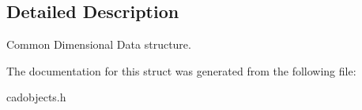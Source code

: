 \subsection{Detailed Description}
Common Dimensional Data structure. 

The documentation for this struct was generated from the following file\+:\begin{DoxyCompactItemize}
\item 
cadobjects.\+h\end{DoxyCompactItemize}
